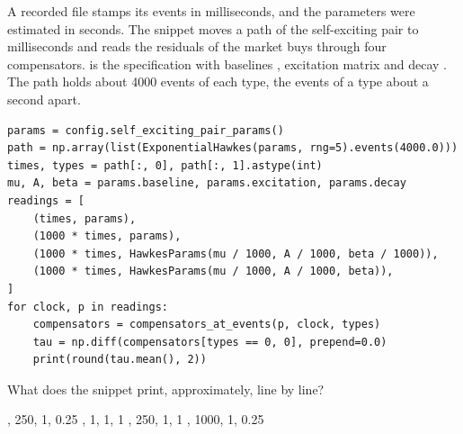 \begin{question}
\label{question.compensatorInMilliseconds}
A recorded file stamps its events in milliseconds,
and the parameters were estimated in seconds.
The snippet moves a path of the self-exciting pair to milliseconds
and reads the residuals of the market buys through four compensators.
 is the specification
with baselines , excitation matrix  and decay .
The path holds about 4000 events of each type,
the events of a type about a second apart.
\begin{lstlisting}[caption={One path, four clocks and specifications}, label=listing.compensatorInMilliseconds]
params = config.self_exciting_pair_params()
path = np.array(list(ExponentialHawkes(params, rng=5).events(4000.0)))
times, types = path[:, 0], path[:, 1].astype(int)
mu, A, beta = params.baseline, params.excitation, params.decay
readings = [
    (times, params),
    (1000 * times, params),
    (1000 * times, HawkesParams(mu / 1000, A / 1000, beta / 1000)),
    (1000 * times, HawkesParams(mu / 1000, A / 1000, beta)),
]
for clock, p in readings:
    compensators = compensators_at_events(p, clock, types)
    tau = np.diff(compensators[types == 0, 0], prepend=0.0)
    print(round(tau.mean(), 2))
\end{lstlisting}
What does the snippet print, approximately, line by line?
\begin{choices}
 , 250, 1, 0.25
 , 1, 1, 1
 , 250, 1, 1
 , 1000, 1, 0.25
\end{choices}
\end{question}

